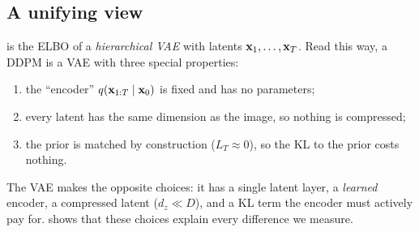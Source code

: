 \subsection{A unifying view}
\label{sec:bg-unify}
 is the ELBO of a \emph{hierarchical VAE} with latents $\mathbf{x}_1,\dots,\mathbf{x}_T$. Read this way, a DDPM is a
VAE with three special properties:
\begin{enumerate}
  \item the ``encoder'' $q(\mathbf{x}_{1:T}\mid\mathbf{x}_0)$ is fixed and has no parameters;
  \item every latent has the same dimension as the image, so nothing is compressed;
  \item the prior is matched by construction ($L_T\approx0$), so the KL to the prior costs nothing.
\end{enumerate}
The VAE makes the opposite choices: it has a single latent layer, a \emph{learned} encoder, a compressed latent
($d_z\ll D$), and a KL term the encoder must actively pay for.  shows that these choices
explain every difference we measure.
